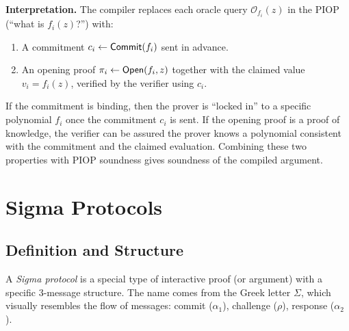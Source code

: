 \documentclass[11pt]{article}
\begin{document}
\medskip
\noindent\textbf{Interpretation.}  The compiler replaces each oracle query
$\mathcal{O}_{f_i}(z)$ in the PIOP (``what is $f_i(z)$?'') with:
\begin{enumerate}
  \item A commitment $c_i \leftarrow \mathsf{Commit}(f_i)$ sent in advance.
  \item An opening proof $\pi_i \leftarrow \mathsf{Open}(f_i, z)$ together with the claimed value
    $v_i = f_i(z)$, verified by the verifier using $c_i$.
\end{enumerate}
If the commitment is binding, then the prover is ``locked in'' to a specific polynomial
$f_i$ once the commitment $c_i$ is sent.  If the opening proof is a proof of knowledge,
the verifier can be assured the prover knows a polynomial consistent with the commitment
and the claimed evaluation.  Combining these two properties with PIOP soundness gives
soundness of the compiled argument.

\section{Sigma Protocols}

\subsection{Definition and Structure}

A \emph{Sigma protocol} is a special type of interactive proof (or argument) with a
specific 3-message structure.  The name comes from the Greek letter $\Sigma$, which
visually resembles the flow of messages: commit ($\alpha_1$), challenge ($\rho$),
response ($\alpha_2$).

\begin{center}
\end{center}
\end{document}
